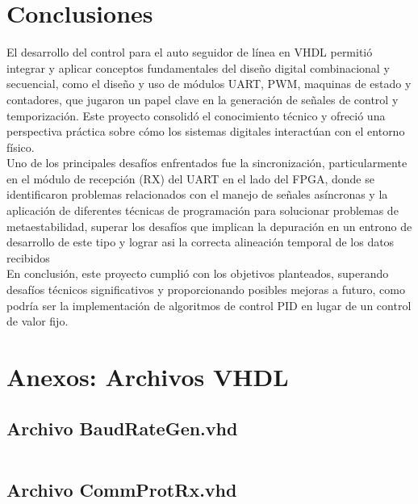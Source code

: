 \documentclass[12pt]{article}
\begin{document}
\newpage
\section{Conclusiones}
El desarrollo del control para el auto seguidor de línea en VHDL permitió integrar y aplicar conceptos fundamentales del diseño digital combinacional y secuencial, como el diseño y uso de módulos UART, PWM, maquinas de estado y contadores, que jugaron un papel clave en la generación de señales de control y temporización. Este proyecto consolidó el conocimiento técnico y ofreció una perspectiva práctica sobre cómo los sistemas digitales interactúan con el entorno físico.
\\

Uno de los principales desafíos enfrentados fue la sincronización, particularmente en el módulo de recepción (RX) del UART en el lado del FPGA, donde se identificaron problemas relacionados con el manejo de señales asíncronas y la aplicación de diferentes técnicas de programación para solucionar problemas de metaestabilidad, superar los desafíos que implican la depuración en un entrono de desarrollo de este tipo y lograr asi la correcta alineación temporal de los datos recibidos
\\

En conclusión, este proyecto cumplió con los objetivos planteados, superando desafíos técnicos significativos y proporcionando posibles mejoras a futuro, como podría ser la implementación de algoritmos de control PID en lugar de un control de valor fijo.

\newpage
{}

\section{Anexos: Archivos VHDL}

\subsection{Archivo \textbf{BaudRateGen.vhd}}
\inputminted[bgcolor=bgcodecolor,xleftmargin=20pt,breaklines,linenos,fontsize=\scriptsize]{vhdl}{../GHDL/BaudRateGen.vhd}
\newpage

\subsection{Archivo \textbf{CommProtRx.vhd}}
\inputminted[bgcolor=bgcodecolor,xleftmargin=20pt,breaklines,linenos,fontsize=\scriptsize]{vhdl}{../GHDL/CommProtRx.vhd}
\newpage
\end{document}
